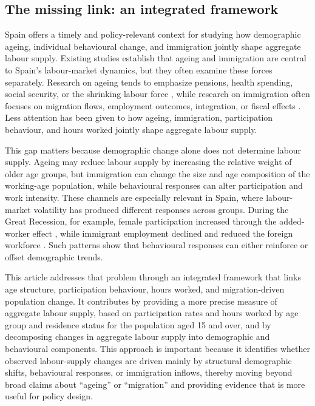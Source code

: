 \subsection{The missing link: an integrated framework}

Spain offers a timely and policy-relevant context for studying how demographic ageing, individual behavioural change, and immigration jointly shape aggregate labour supply. Existing studies establish that ageing and immigration are central to Spain's labour-market dynamics, but they often examine these forces separately. Research on ageing tends to emphasize pensions, health spending, social security, or the shrinking labour force \parencite{maestas2023effect,bde2023ageingParticipation,caixabank2017labourForceAgeing}, while research on immigration often focuses on migration flows, employment outcomes, integration, or fiscal effects \parencite{rodriguez2016labor,gonzalez2011very,preston2014effect}. Less attention has been given to how ageing, immigration, participation behaviour, and hours worked jointly shape aggregate labour supply.

\vspace{0.7em}\par
This gap matters because demographic change alone does not determine labour supply. Ageing may reduce labour supply by increasing the relative weight of older age groups, but immigration can change the size and age composition of the working-age population, while behavioural responses can alter participation and work intensity. These channels are especially relevant in Spain, where labour-market volatility has produced different responses across groups. During the Great Recession, for example, female participation increased through the added-worker effect \parencite{congregado2014unemployment,sanz2020labor}, while immigrant employment declined and reduced the foreign workforce \parencite{rodriguez2016labor}. Such patterns show that behavioural responses can either reinforce or offset demographic trends.

\vspace{0.7em}\par
This article addresses that problem through an integrated framework that links age structure, participation behaviour, hours worked, and migration-driven population change. It contributes by providing a more precise measure of aggregate labour supply, based on participation rates and hours worked by age group and residence status for the population aged 15 and over, and by decomposing changes in aggregate labour supply into demographic and behavioural components. This approach is important because it identifies whether observed labour-supply changes are driven mainly by structural demographic shifts, behavioural responses, or immigration inflows, thereby moving beyond broad claims about “ageing” or “migration” and providing evidence that is more useful for policy design.
